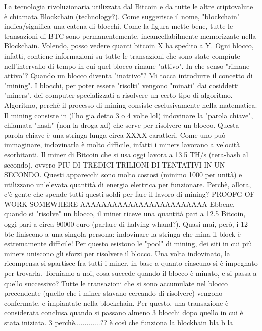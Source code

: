 \documentclass {article}
\begin{document}
	
La tecnologia rivoluzionaria utilizzata dal Bitcoin e da tutte le altre criptovalute è chiamata Blockchain (technology?).
Come suggerisce il nome, "blockchain" indica/significa una catena di blocchi.
Come la figura mette bene, tutte le transazioni di BTC sono permanentemente, incancellabilmente memorizzate nella Blockchain.
Volendo, posso vedere quanti bitcoin X ha spedito a Y. Ogni blocco, infatti, contiene informazioni su tutte le transazioni che sono state compiute nell'intervallo di tempo in cui quel blocco rimane "attivo".
In che senso "rimane attivo"? Quando un blocco diventa "inattivo"?
Mi tocca introdurre il concetto di "mining".
I blocchi, per poter essere "risolti" vengono "minati" dai cosiddetti "miners", dei computer specializzati a risolvere un certo tipo di algoritmo.
Algoritmo, perchè il processo di mining consiste esclusivamente nella matematica.
Il mining consiste in (l'ho gia detto 3 o 4 volte lol) indovinare la "parola chiave", chiamata "hash" (non la droga xd) che serve per risolvere un blocco.
Questa parola chiave è una stringa lunga circa XXXX caratteri.
Come uno può immaginare, indovinarla è molto difficile, infatti i miners lavorano a velocità esorbitanti.
Il miner di Bitcoin che si usa oggi lavora a 13.5 TH/s (tera-hash al secondo), ovvero PIU DI TREDICI TRILIONI DI TENTATIVI IN UN SECONDO.
Questi apparecchi sono molto costosi (minimo 1000 per unità) e utilizzano un'elevata quantità di energia elettrica per funzionare.
Perchè, allora, c'è gente che spende tutti questi soldi per fare il lavoro di mining? PROOFG  OF WORK SOMEWHERE AAAAAAAAAAAAAAAAAAAAAAAA
Ebbene, quando si "risolve" un blocco, il miner riceve una quantità pari a 12.5 Bitcoin, oggi pari a circa 90000 euro (parlare di halving whand?). Quasi mai, però, i 12 btc finiscono a una singola persona: indovinare la stringa che mina il block è estremamente difficile! Per questo esistono le "pool" di mining, dei siti in cui più miners uniscono gli sforzi per risolvere il blocco. Una volta indovinato, la ricompensa si spartisce fra tutti i miner, in base a quanto ciascuno si è impegnato per trovarla.
Torniamo a noi, cosa succede quando il blocco è minato, e si passa a quello successivo? Tutte le transazioni che si sono accumulate nel blocco precendente (quello che i miner stavano cercando di risolvere) vengono confermate, e impiantate nella blockchain. Per questo, una transazione è considerata conclusa quando si passano almeno 3 blocchi dopo quello in cui è stata iniziata.
3 perchè.............??
è così che funziona la blockhain bla b la
\end{document}
